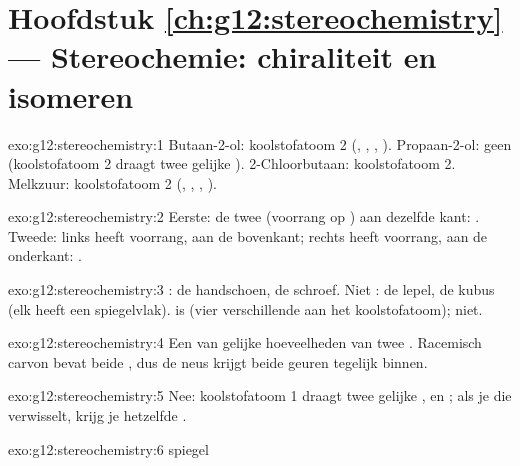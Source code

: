 \section*{Hoofdstuk \ref{ch:g12:stereochemistry} --- Stereochemie: chiraliteit en isomeren}

\begin{solution}{exo:g12:stereochemistry:1}
Butaan-2-ol: koolstofatoom 2 (, , , ).
Propaan-2-ol: geen (koolstofatoom 2 draagt twee gelijke ).
2-Chloorbutaan: koolstofatoom 2. Melkzuur: koolstofatoom 2 (,
, , ).
\end{solution}

\begin{solution}{exo:g12:stereochemistry:2}
Eerste: de twee  (voorrang op ) aan dezelfde kant: .
Tweede: links heeft  voorrang, aan de bovenkant; rechts heeft
 voorrang, aan de onderkant: .
\end{solution}

\begin{solution}{exo:g12:stereochemistry:3}
: de handschoen, de schroef. Niet : de lepel, de kubus
(elk heeft een spiegelvlak).  is  (vier verschillende
 aan het koolstofatoom);  niet.
\end{solution}

\begin{solution}{exo:g12:stereochemistry:4}
Een  van gelijke hoeveelheden van twee . Racemisch
carvon bevat beide , dus de neus krijgt beide geuren
tegelijk binnen.
\end{solution}

\begin{solution}{exo:g12:stereochemistry:5}
Nee: koolstofatoom 1 draagt twee gelijke ,  en ; als
je die verwisselt, krijg je hetzelfde .
\end{solution}

\begin{solution}{exo:g12:stereochemistry:6}
 \quad spiegel
\quad {}
\end{solution}

